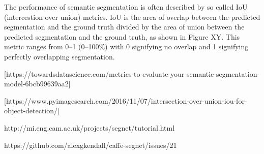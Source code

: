The performance of semantic segmentation is often described by so called IoU (intercestion over union) metrics. IoU is the area of overlap between the predicted segmentation and the ground truth divided by the area of union between the predicted segmentation and the ground truth, as shown in Figure XY. This metric ranges from 0–1 (0–100\%) with 0 signifying no overlap and 1 signifying perfectly overlapping segmentation.

[https://towardsdatascience.com/metrics-to-evaluate-your-semantic-segmentation-model-6bcb99639aa2]

[https://www.pyimagesearch.com/2016/11/07/intersection-over-union-iou-for-object-detection/]

http://mi.eng.cam.ac.uk/projects/segnet/tutorial.html

https://github.com/alexgkendall/caffe-segnet/issues/21





